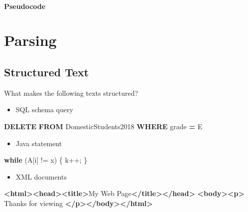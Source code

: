 \documentclass[
]{book}
\newenvironment{Shaded}{\begin{snugshade}}{\end{snugshade}}
\newcommand{\KeywordTok}[1]{\textcolor[rgb]{0.13,0.29,0.53}{\textbf{#1}}}
\newcommand{\NormalTok}[1]{#1}
\newcommand{\OperatorTok}[1]{\textcolor[rgb]{0.81,0.36,0.00}{\textbf{#1}}}
\newcommand{\StringTok}[1]{\textcolor[rgb]{0.31,0.60,0.02}{#1}}
\providecommand{\tightlist}{%
  \setlength{\itemsep}{0pt}\setlength{\parskip}{0pt}}
\begin{document}
\hypertarget{pseudocode-1}{%
\subsubsection{Pseudocode}\label{pseudocode-1}}

\hypertarget{parse}{%
\chapter{Parsing}\label{parse}}

\hypertarget{structured-text}{%
\section{Structured Text}\label{structured-text}}

What makes the following texts structured?

\begin{itemize}
\tightlist
\item
  SQL schema query
\end{itemize}

\begin{Shaded}
\begin{Highlighting}[]
\KeywordTok{DELETE} \KeywordTok{FROM}\NormalTok{ DomesticStudents2018}
\KeywordTok{WHERE}\NormalTok{ grade }\OperatorTok{=} \StringTok{\textquotesingle{}E\textquotesingle{}}
\end{Highlighting}
\end{Shaded}

\begin{itemize}
\tightlist
\item
  Java statement
\end{itemize}

\begin{Shaded}
\begin{Highlighting}[]
\KeywordTok{while}\NormalTok{ (A[i] != x) \{}
\NormalTok{  k++;}
\NormalTok{\}}
\end{Highlighting}
\end{Shaded}

\begin{itemize}
\tightlist
\item
  XML documents
\end{itemize}

\begin{Shaded}
\begin{Highlighting}[]
\KeywordTok{\textless{}html\textgreater{}\textless{}head\textgreater{}\textless{}title\textgreater{}}\NormalTok{My Web Page}\KeywordTok{\textless{}/title\textgreater{}\textless{}/head\textgreater{}}
\KeywordTok{\textless{}body\textgreater{}\textless{}p\textgreater{}}\NormalTok{ Thanks for viewing }\KeywordTok{\textless{}/p\textgreater{}\textless{}/body\textgreater{}\textless{}/html\textgreater{}}
\end{Highlighting}
\end{Shaded}
\end{document}
